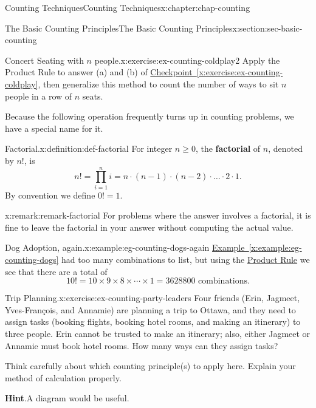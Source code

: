 \documentclass[oneside,10pt,]{book}
\newcommand{\blocktitlefont}{\relax}
\newcommand{\xreffont}{\relax}
\newcommand{\terminology}[1]{\textbf{#1}}
\numberwithin{equation}{section}
\begin{document}
\begin{chapterptx}{Counting Techniques}{}{Counting Techniques}{}{}{x:chapter:chap-counting}
\begin{sectionptx}{The Basic Counting Principles}{}{The Basic Counting Principles}{}{}{x:section:sec-basic-counting}
\begin{inlineexercise}{Concert Seating with \(n\) people.}{x:exercise:ex-counting-coldplay2}
Apply the Product Rule to answer (a) and (b) of \hyperref[x:exercise:ex-counting-coldplay]{Checkpoint~{\xreffont\ref{x:exercise:ex-counting-coldplay}}}, then generalize this method to count the number of ways to sit \(n\) people in a row of \(n\) seats.%
\end{inlineexercise}%
Because the following operation frequently turns up in counting problems, we have a special name for it.%
\begin{definition}{Factorial.}{x:definition:def-factorial}%
For integer \(n \geq 0\), the \terminology{factorial} of \(n\), denoted by \(n!\), is%
\begin{equation*}
n! = \prod_{i=1}^n i = n \cdot (n-1) \cdot (n-2) \cdot \ldots \cdot 2 \cdot 1\text{.}
\end{equation*}
By convention we define \(0! = 1\). \label{g:notation:id526215}%
\end{definition}
\begin{remark}{}{x:remark:remark-factorial}%
For problems where the answer involves a factorial, it is fine to leave the factorial in your answer without computing the actual value.%
\end{remark}
\begin{example}{Dog Adoption, again.}{x:example:eg-counting-dogs-again}%
\hyperref[x:example:eg-counting-dogs]{Example~{\xreffont\ref{x:example:eg-counting-dogs}}} had too many combinations to list, but using the \hyperref[x:principle:prin-prod-rule]{Product Rule} we see that there are a total of%
\begin{equation*}
10! = 10 \times 9 \times 8 \times \cdots \times 1 = 3628800 \text{ combinations}\text{.}
\end{equation*}
%
\end{example}
\begin{inlineexercise}{Trip Planning.}{x:exercise:ex-counting-party-leaders}%
Four friends (Erin, Jagmeet, Yves-François, and Annamie) are planning a trip to Ottawa, and they need to assign tasks (booking flights, booking hotel rooms, and making an itinerary) to three people. Erin cannot be trusted to make an itinerary; also, either Jagmeet or Annamie must book hotel rooms. How many ways can they assign tasks?%
\par
Think carefully about which counting principle(s) to apply here. Explain your method of calculation properly.%
\par\smallskip%
\noindent\textbf{\blocktitlefont Hint}.\hypertarget{g:hint:id526242}{}\quad{}A diagram would be useful.%
\end{inlineexercise}%

\end{sectionptx}
\end{chapterptx}
\end{document}
